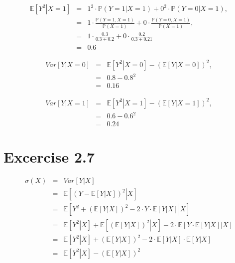 \documentclass{article}
\begin{document}
\begin{eqnarray*}
\mathbb{E}\left[ \left. Y^{2}\right\vert X=1\right] &=&1^{2}\cdot \mathbb{P}%
\left( \left. Y=1\right\vert X=1\right) +0^{2}\cdot \mathbb{P}\left( \left.
Y=0\right\vert X=1\right) , \\
&=&1\cdot \frac{\mathbb{P}\left( Y=1,X=1\right) }{\mathbb{P}\left(
X=1\right) }+0\cdot \frac{\mathbb{P}\left( Y=0,X=1\right) }{\mathbb{P}\left(
X=1\right) }, \\
&=&1\cdot \frac{0.3}{0.3+0.2}+0\cdot \frac{0.2}{0.3+0.21} \\
&=&0.6
\end{eqnarray*}

\begin{eqnarray*}
Var\left[ \left. Y\right\vert X=0\right] &=&\mathbb{E}\left[ \left.
Y^{2}\right\vert X=0\right] -\left( \mathbb{E}\left[ \left. Y\right\vert X=0%
\right] \right) ^{2}, \\
&=&0.8-0.8^{2} \\
&=&0.16
\end{eqnarray*}

\begin{eqnarray*}
Var\left[ \left. Y\right\vert X=1\right] &=&\mathbb{E}\left[ \left.
Y^{2}\right\vert X=1\right] -\left( \mathbb{E}\left[ \left. Y\right\vert X=1%
\right] \right) ^{2}, \\
&=&0.6-0.6^{2} \\
&=&0.24
\end{eqnarray*}

\section*{Excercise 2.7}

\begin{eqnarray*}
\sigma \left( X\right) &=&Var\left[ \left. Y\right\vert X\right] \\
&=&\mathbb{E}\left[ \left. \left( Y-\mathbb{E}\left[ \left. Y\right\vert X%
\right] \right) ^{2}\right\vert X\right] \\
&=&\mathbb{E}\left[ \left. Y^{2}+\left( \mathbb{E}\left[ \left. Y\right\vert
X\right] \right) ^{2}-2\cdot Y\cdot \mathbb{E}\left[ \left. Y\right\vert X%
\right] \right\vert X\right] \\
&=&\mathbb{E}\left[ \left. Y^{2}\right\vert X\right] +\mathbb{E}\left[
\left. \left( \mathbb{E}\left[ \left. Y\right\vert X\right] \right)
^{2}\right\vert X\right] -2\cdot \mathbb{E}\left[ \left. Y\cdot \mathbb{E}%
\left[ \left. Y\right\vert X\right] \right\vert X\right] \\
&=&\mathbb{E}\left[ \left. Y^{2}\right\vert X\right] +\left( \mathbb{E}\left[
\left. Y\right\vert X\right] \right) ^{2}-2\cdot \mathbb{E}\left[ \left.
Y\right\vert X\right] \cdot \mathbb{E}\left[ \left. Y\right\vert X\right] \\
&=&\mathbb{E}\left[ \left. Y^{2}\right\vert X\right] -\left( \mathbb{E}\left[
\left. Y\right\vert X\right] \right) ^{2}
\end{eqnarray*}
\end{document}
